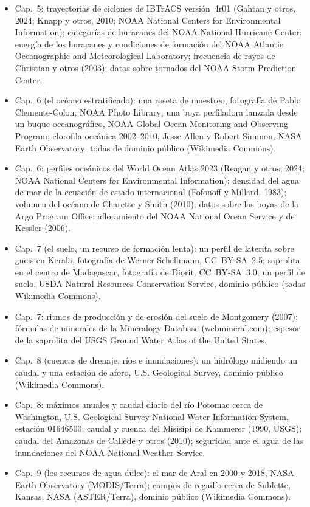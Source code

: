\begin{itemize}
  \item Cap.~5: trayectorias de ciclones de IBTrACS versión~4r01 (Gahtan y otros, 2024; Knapp y otros, 2010; NOAA National Centers for Environmental Information); categorías de huracanes del NOAA National Hurricane Center; energía de los huracanes y condiciones de formación del NOAA Atlantic Oceanographic and Meteorological Laboratory; frecuencia de rayos de Christian y otros (2003); datos sobre tornados del NOAA Storm Prediction Center.
  \item Cap.~6 (el océano estratificado): una roseta de muestreo, fotografía de Pablo Clemente-Colon, NOAA Photo Library; una boya perfiladora lanzada desde un buque oceanográfico, NOAA Global Ocean Monitoring and Observing Program; clorofila oceánica 2002--2010, Jesse Allen y Robert Simmon, NASA Earth Observatory; todas de dominio público (Wikimedia Commons).
  \item Cap.~6: perfiles oceánicos del World Ocean Atlas 2023 (Reagan y otros, 2024; NOAA National Centers for Environmental Information); densidad del agua de mar de la ecuación de estado internacional (Fofonoff y Millard, 1983); volumen del océano de Charette y Smith (2010); datos sobre las boyas de la Argo Program Office; afloramiento del NOAA National Ocean Service y de Kessler (2006).
  \item Cap.~7 (el suelo, un recurso de formación lenta): un perfil de laterita sobre gneis en Kerala, fotografía de Werner Schellmann, CC~BY-SA~2.5; saprolita en el centro de Madagascar, fotografía de Diorit, CC~BY-SA~3.0; un perfil de suelo, USDA Natural Resources Conservation Service, dominio público (todas Wikimedia Commons).
  \item Cap.~7: ritmos de producción y de erosión del suelo de Montgomery (2007); fórmulas de minerales de la Mineralogy Database (webmineral.com); espesor de la saprolita del USGS Ground Water Atlas of the United States.
  \item Cap.~8 (cuencas de drenaje, ríos e inundaciones): un hidrólogo midiendo un caudal y una estación de aforo, U.S. Geological Survey, dominio público (Wikimedia Commons).
  \item Cap.~8: máximos anuales y caudal diario del río Potomac cerca de Washington, U.S. Geological Survey National Water Information System, estación 01646500; caudal y cuenca del Misisipi de Kammerer (1990, USGS); caudal del Amazonas de Callède y otros (2010); seguridad ante el agua de las inundaciones del NOAA National Weather Service.
  \item Cap.~9 (los recursos de agua dulce): el mar de Aral en 2000 y 2018, NASA Earth Observatory (MODIS/Terra); campos de regadío cerca de Sublette, Kansas, NASA (ASTER/Terra), dominio público (Wikimedia Commons).

\end{itemize}
